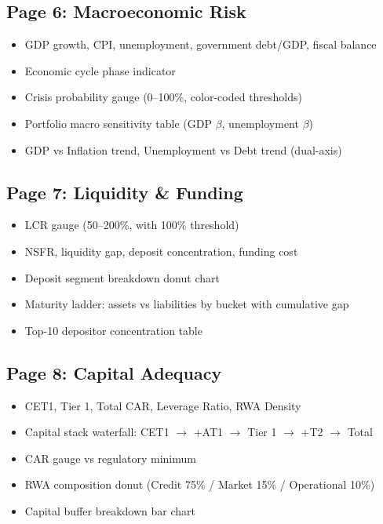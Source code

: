 \documentclass[12pt,a4paper]{article}
\begin{document}
\subsection{Page 6: Macroeconomic Risk}

\begin{itemize}
    \item GDP growth, CPI, unemployment, government debt/GDP, fiscal balance
    \item Economic cycle phase indicator
    \item Crisis probability gauge (0--100\%, color-coded thresholds)
    \item Portfolio macro sensitivity table (GDP $\beta$, unemployment $\beta$)
    \item GDP vs Inflation trend, Unemployment vs Debt trend (dual-axis)
\end{itemize}

\subsection{Page 7: Liquidity \& Funding}

\begin{itemize}
    \item LCR gauge (50--200\%, with 100\% threshold)
    \item NSFR, liquidity gap, deposit concentration, funding cost
    \item Deposit segment breakdown donut chart
    \item Maturity ladder: assets vs liabilities by bucket with cumulative gap
    \item Top-10 depositor concentration table
\end{itemize}

\subsection{Page 8: Capital Adequacy}

\begin{itemize}
    \item CET1, Tier 1, Total CAR, Leverage Ratio, RWA Density
    \item Capital stack waterfall: CET1 $\rightarrow$ +AT1 $\rightarrow$ Tier 1 $\rightarrow$ +T2 $\rightarrow$ Total
    \item CAR gauge vs regulatory minimum
    \item RWA composition donut (Credit 75\% / Market 15\% / Operational 10\%)
    \item Capital buffer breakdown bar chart
\end{itemize}
\end{document}
